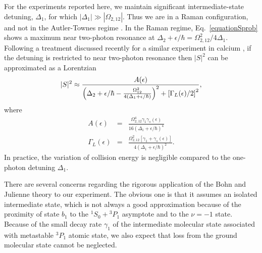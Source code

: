 For the experiments reported here, we maintain significant intermediate-state detuning, $\Delta_1$, for which $|\Delta_1|\gg |\Omega_{2,12}|$. Thus we are in a Raman configuration, and not in the Autler-Townes regime \cite{mmp08}.  In the Raman regime, Eq.\ \ref{equationSprob} shows a maximum near two-photon resonance at $\Delta_2+\epsilon/\hbar =\Omega_{2,12}^2/4\Delta_1$. Following a treatment discussed recently for a similar experiment in calcium \cite{Pachomow2017a}, if the detuning is restricted to near two-photon resonance then $\vert S\vert^2$ can be approximated as a Lorentzian
\begin{eqnarray}\label{equationSprobLorentzian}
 \vert S\vert^2 \approx {A(\epsilon) \over
 \left(\Delta_2+\epsilon/\hbar-\frac{\Omega_{12}^{2}}{4(\Delta_1+\epsilon/\hbar)}\right)^2+\left[ {\Gamma_L(\epsilon)}/{2}\right]^2},
\end{eqnarray}
where 
\begin{eqnarray}\label{ApproxLorentzianQuantitiesMain}
  A(\epsilon)&=& \frac{\Omega_{2,12}^{4}\gamma_1 \gamma_s(\epsilon)}{16(\Delta_1+\epsilon/\hbar)^4} \\
  \label{ApproxLorentzianQuantities-2Main}
  \Gamma_L(\epsilon)&=& \frac{\Omega_{2,12}^{2}[\gamma_1 +\gamma_s(\epsilon)]}{4(\Delta_1+\epsilon/\hbar)^2}.
\end{eqnarray}
In practice, the variation of collision energy is negligible compared to the one-photon detuning $\Delta_1$. 







There are several concerns regarding the rigorous application of the Bohn and Julienne theory \cite{bju96}  to our experiment. The obvious one is that it assumes an isolated intermediate state, which is not always a good approximation because of the proximity of state $b_1$ to the $^1S_0+{^3P_1}$ asymptote and to the $\nu=-1$ state. Because of the small decay rate $\gamma_1$ of the intermediate molecular state associated with metastable $^3 P_1$ atomic state, we also expect that loss from the ground molecular state cannot be neglected.


